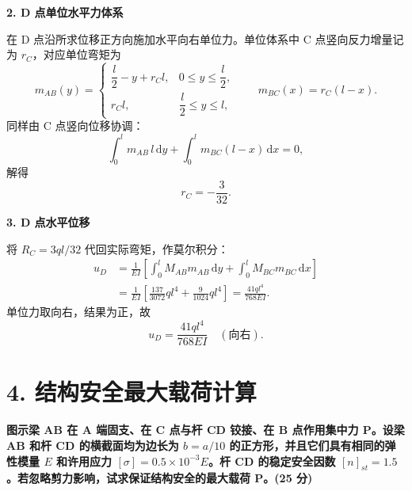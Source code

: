 \documentclass[11pt,a4paper]{ctexrep}
\newcommand{\diff}{\,\mathrm{d}}
\begin{document}
{\textbf{2. D 点单位水平力体系}

在 D 点沿所求位移正方向施加水平向右单位力。单位体系中 C 点竖向反力增量记为 $r_C$，对应单位弯矩为
\[
m_{AB}(y)=
\begin{cases}
\dfrac l2-y+r_C l, & 0\le y\le \dfrac l2,\\[4pt]
r_C l, & \dfrac l2\le y\le l,
\end{cases}
\qquad
m_{BC}(x)=r_C(l-x).
\]
同样由 C 点竖向位移协调：
\[
\int_0^l m_{AB}\,l\diff y+\int_0^l m_{BC}(l-x)\diff x=0,
\]
解得
\[
r_C=-\frac{3}{32}.
\]

\textbf{3. D 点水平位移}

将 $R_C=3ql/32$ 代回实际弯矩，作莫尔积分：
\[
\begin{aligned}
u_D
&=\frac1{EI}\left[
\int_0^l M_{AB}m_{AB}\diff y+\int_0^l M_{BC}m_{BC}\diff x
\right]\\
&=\frac1{EI}\left[
\frac{137}{3072}ql^4+\frac{9}{1024}ql^4
\right]
=\frac{41ql^4}{768EI}.
\end{aligned}
\]
单位力取向右，结果为正，故
\[
u_D=\frac{41ql^4}{768EI}\quad(\text{向右}).
\]




\section*{4. 结构安全最大载荷计算}

\textbf{图示梁 AB 在 A 端固支、在 C 点与杆 CD 铰接、在 B 点作用集中力 P。设梁 AB 和杆 CD 的横截面均为边长为 $b = a/10$ 的正方形，并且它们具有相同的弹性模量 $E$ 和许用应力 $[\sigma] = 0.5 \times 10^{-3} E$。杆 CD 的稳定安全因数 $[n]_{st} = 1.5$。若忽略剪力影响，试求保证结构安全的最大载荷 P。(25 分)}

\begin{center}
\end{center}}
\end{document}

